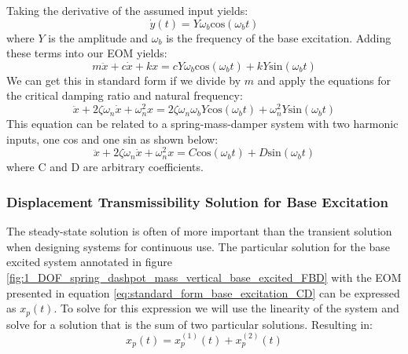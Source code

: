 \documentclass[12pt,letter]{article}
\numberwithin{ex}{section} %
\numberwithin{re}{section} %
\numberwithin{pr}{section} %
\begin{document}
			Taking the derivative of the assumed input yields:
			\begin{equation}
			\dot{y}(t) = Y \omega_b \text{cos}(\omega_b t)
			\end{equation}
			where $Y$ is the amplitude and $\omega_b$ is the frequency of the base excitation. Adding these terms into our EOM yields:
			\begin{equation}
			m\ddot{x} + c\dot{x} + kx = c Y \omega_b \text{cos}(\omega_b t)  + k Y\text{sin}(\omega_b t)  
			\end{equation}
			We can get this in standard form if we divide by $m$ and apply the equations for the critical damping ratio and natural frequency:
			\begin{equation}
			\ddot{x} + 2 \zeta \omega_n \dot{x} + \omega_n^2x = 2 \zeta \omega_n \omega_b Y \text{cos}(\omega_b t)  + \omega_n^2 Y\text{sin}(\omega_b t)
			\label{eq:standard_form_base_excitation}  
			\end{equation}
			This equation can be related to a spring-mass-damper system with two harmonic inputs, one cos and one sin as shown below:
			\begin{equation}
			\ddot{x} + 2 \zeta \omega_n \dot{x} + \omega_n^2x = C \text{cos}(\omega_b t)  + D \text{sin}(\omega_b t)  
			\label{eq:standard_form_base_excitation_CD}
			\end{equation}
			where C and D are arbitrary coefficients. 

	
			\subsubsection{Displacement Transmissibility Solution for Base Excitation}
				The steady-state solution is often of more important than the transient solution when designing systems for continuous use. The particular solution for the base excited system annotated in figure \ref{fig:1_DOF_spring_dashpot_mass_vertical_base_excited_FBD} with the EOM presented in equation \ref{eq:standard_form_base_excitation_CD} can be expressed as $	x_p(t)$. To solve for this expression we will use the linearity of the system and solve for a solution that is the sum of two particular solutions. Resulting in:
				\begin{equation}
				 x_p(t) = 	x_p^{(1)}(t) + 	x_p^{(2)}(t)  
				\end{equation}
				
\end{document}
